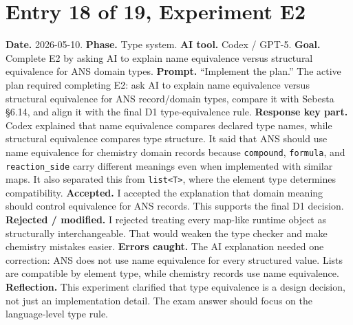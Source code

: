 \documentclass[11pt,a4paper]{article}
\newcommand{\code}[1]{\texttt{#1}}
\begin{document}
\section*{Entry 18 of 19, Experiment E2}
\textbf{Date.} 2026-05-10.
\textbf{Phase.} Type system.
\textbf{AI tool.} Codex / GPT-5.
\textbf{Goal.} Complete E2 by asking AI to explain name equivalence versus structural equivalence for ANS domain types.
\textbf{Prompt.} ``Implement the plan.'' The active plan required completing E2: ask AI to explain name equivalence versus structural equivalence for ANS record/domain types, compare it with Sebesta \S6.14, and align it with the final D1 type-equivalence rule.
\textbf{Response key part.} Codex explained that name equivalence compares declared type names, while structural equivalence compares type structure. It said that ANS should use name equivalence for chemistry domain records because \code{compound}, \code{formula}, and \code{reaction\_side} carry different meanings even when implemented with similar maps. It also separated this from \code{list<T>}, where the element type determines compatibility.
\textbf{Accepted.} I accepted the explanation that domain meaning should control equivalence for ANS records. This supports the final D1 decision.
\textbf{Rejected / modified.} I rejected treating every map-like runtime object as structurally interchangeable. That would weaken the type checker and make chemistry mistakes easier.
\textbf{Errors caught.} The AI explanation needed one correction: ANS does not use name equivalence for every structured value. Lists are compatible by element type, while chemistry records use name equivalence.
\textbf{Reflection.} This experiment clarified that type equivalence is a design decision, not just an implementation detail. The exam answer should focus on the language-level type rule.
\end{document}

